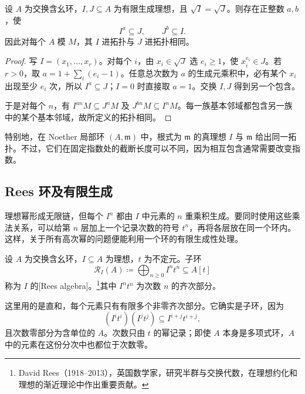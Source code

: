 \begin{proposition}\label{g5:prop:adic-equivalent-powers}
	设 \(A\) 为交换含幺环，\(I,J\subseteq A\) 为有限生成理想，且 \(\sqrt I=\sqrt J\)。则存在正整数 \(a,b\)，使
	\[
		I^a\subseteq J,\qquad J^b\subseteq I.
	\]
	因此对每个 \(A\) 模 \(M\)，其 \(I\) 进拓扑与 \(J\) 进拓扑相同。
\end{proposition}
\begin{proof}
	写 \(I=(x_1,\ldots,x_r)\)。对每个 \(i\)，由 \(x_i\in\sqrt J\) 选 \(e_i\geq1\)，使 \(x_i^{e_i}\in J\)。若 \(r>0\)，取
	\(a=1+\sum_i(e_i-1)\)。任意总次数为 \(a\) 的生成元乘积中，必有某个 \(x_i\) 出现至少 \(e_i\) 次，所以 \(I^a\subseteq J\)；\(I=0\) 时直接取 \(a=1\)。交换 \(I,J\) 得到另一个包含。

	于是对每个 \(n\)，有 \(I^{an}M\subseteq J^nM\) 及 \(J^{bn}M\subseteq I^nM\)。每一族基本邻域都包含另一族中的某个基本邻域，故所定义的拓扑相同。
\end{proof}

特别地，在 Noether 局部环 \((A,\mathfrak m)\) 中，根式为 \(\mathfrak m\) 的真理想 \(I\) 与 \(\mathfrak m\) 给出同一拓扑。不过，它们在固定指数处的截断长度可以不同，因为相互包含通常需要改变指数。

\subsection{Rees 环及有限生成}
\label{g5:subsec:0701:02}

理想幂形成无限链，但每个 \(I^n\) 都由 \(I\) 中元素的 \(n\) 重乘积生成。要同时使用这些乘法关系，可以给第 \(n\) 层加上一个记录次数的符号 \(t^n\)，再将各层放在同一个环内。这样，关于所有高次幂的问题便能利用一个环的有限生成性处理。

\begin{definition}\label{g5:def:rees-algebra}
	设 \(A\) 为交换含幺环，\(I\subseteq A\) 为理想，\(t\) 为不定元。子环
	\[
		\mathcal R_I(A)\coloneqq\bigoplus_{n\geq0}I^nt^n
		\subseteq A[t]
	\]
	称为 \(I\) 的[Rees algebra]。\footnote{David Rees（1918--2013），英国数学家，研究半群与交换代数，在理想约化和理想的渐近理论中作出重要贡献。}其中 \(I^nt^n\) 为次数 \(n\) 的齐次部分。
\end{definition}

这里用的是直和，每个元素只有有限多个非零齐次部分。它确实是子环，因为
\[
	(I^it^i)(I^jt^j)\subseteq I^{i+j}t^{i+j},
\]
且次数零部分为含单位的 \(A\)。次数只由 \(t\) 的幂记录；即使 \(A\) 本身是多项式环，\(A\) 中的元素在这份分次中也都位于次数零。

